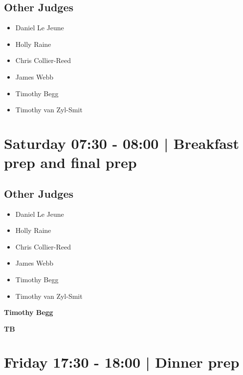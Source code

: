 \documentclass[10pt]{article}
\newcommand{\newtitle}[1]{\begin{center}{\Huge\bfseries #1 }\\ \vspace{5mm}\end{center}}
\newcommand{\newsubtitle}[1]{\begin{center}{\color{grey}\Large\bfseries #1 }\\ \vspace{5mm}\end{center}}
\begin{document}
                
        \subsection*{Other Judges}
        
            \begin{itemize}
                            \item Daniel Le Jeune
                            \item Holly Raine
                            \item Chris Collier-Reed
                            \item James Webb
                            \item Timothy Begg
                            \item Timothy van Zyl-Smit
                        \end{itemize}
        

            \section*{Saturday 07:30
        -
        08:00
        |
         Breakfast prep and final prep}
        
                
        \subsection*{Other Judges}
        
            \begin{itemize}
                            \item Daniel Le Jeune
                            \item Holly Raine
                            \item Chris Collier-Reed
                            \item James Webb
                            \item Timothy Begg
                            \item Timothy van Zyl-Smit
                        \end{itemize}
        

    
	\clearpage

		\newtitle{Timothy Begg}
	\newsubtitle{TB}

            \section*{Friday 17:30
        -
        18:00
        |
         Dinner prep}
        
\end{document}

